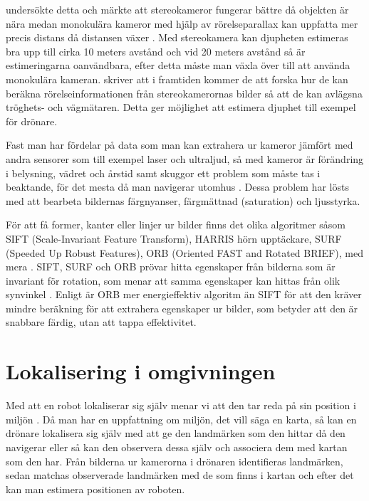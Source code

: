 \cite{suomimainittu} undersökte detta och märkte att stereokameror fungerar bättre då objekten är nära medan monokulära kameror med hjälp av rörelseparallax kan uppfatta mer precis distans då distansen växer \citep{suomimainittu}. Med stereokamera kan djupheten estimeras bra upp till cirka 10 meters avstånd och vid 20 meters avstånd så är estimeringarna oanvändbara, efter detta måste man växla över till att använda monokulära kameran. \cite{suomimainittu} skriver att i framtiden kommer de att forska hur de kan beräkna rörelseinformationen från stereokamerornas bilder så att de kan avlägsna tröghets- och vägmätaren. Detta ger möjlighet att estimera djuphet till exempel för drönare.

Fast man har fördelar på data som man kan extrahera ur kameror jämfört med andra sensorer som till exempel laser och ultraljud, så med kameror är förändring i belysning, vädret och årstid samt skuggor ett problem som måste tas i beaktande, för det mesta då man navigerar utomhus \citep{982903}. Dessa problem har lösts med att bearbeta bildernas färgnyanser, färgmättnad (saturation) och ljusstyrka.

För att få former, kanter eller linjer ur bilder finns det olika algoritmer såsom SIFT (Scale-Invariant Feature Transform), HARRIS hörn upptäckare, SURF (Speeded Up Robust Features), ORB (Oriented FAST and Rotated BRIEF), med mera \citep{orb, slamproblem, mapbuildingsift}. SIFT, SURF och ORB prövar hitta egenskaper från bilderna som är invariant för rotation, som menar att samma egenskaper kan hittas från olik synvinkel \citep{orb}. Enligt \cite{orb} är ORB mer energieffektiv algoritm än SIFT för att den kräver mindre beräkning för att extrahera egenskaper ur bilder, som betyder att den är snabbare färdig, utan att tappa effektivitet.

\section{Lokalisering i omgivningen}

Med att en robot lokaliserar sig själv menar vi att den tar reda på sin position i miljön \citep{982903}. Då man har en uppfattning om miljön, det vill säga en karta, så kan en drönare lokalisera sig själv med att ge den landmärken som den hittar då den navigerar eller så kan den observera dessa själv och associera dem med kartan som den har. Från bilderna ur kamerorna i drönaren identifieras landmärken, sedan matchas observerade landmärken med de som finns i kartan och efter det kan man estimera positionen av roboten.

